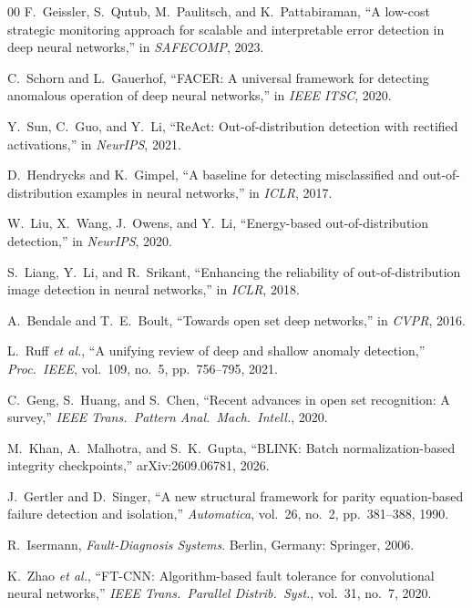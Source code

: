 \documentclass[journal]{IEEEtran}
\begin{document}
\begin{thebibliography}{00}
F.~Geissler, S.~Qutub, M.~Paulitsch, and K.~Pattabiraman, ``A low-cost strategic monitoring approach for scalable and interpretable error detection in deep neural networks,'' in \textit{SAFECOMP}, 2023.

C.~Schorn and L.~Gauerhof, ``FACER: A universal framework for detecting anomalous operation of deep neural networks,'' in \textit{IEEE ITSC}, 2020.

Y.~Sun, C.~Guo, and Y.~Li, ``ReAct: Out-of-distribution detection with rectified activations,'' in \textit{NeurIPS}, 2021.

D.~Hendrycks and K.~Gimpel, ``A baseline for detecting misclassified and out-of-distribution examples in neural networks,'' in \textit{ICLR}, 2017.

W.~Liu, X.~Wang, J.~Owens, and Y.~Li, ``Energy-based out-of-distribution detection,'' in \textit{NeurIPS}, 2020.

S.~Liang, Y.~Li, and R.~Srikant, ``Enhancing the reliability of out-of-distribution image detection in neural networks,'' in \textit{ICLR}, 2018.

A.~Bendale and T.~E.~Boult, ``Towards open set deep networks,'' in \textit{CVPR}, 2016.

L.~Ruff \textit{et al.}, ``A unifying review of deep and shallow anomaly detection,'' \textit{Proc.\ IEEE}, vol.~109, no.~5, pp.~756--795, 2021.

C.~Geng, S.~Huang, and S.~Chen, ``Recent advances in open set recognition: A survey,'' \textit{IEEE Trans.\ Pattern Anal.\ Mach.\ Intell.}, 2020.

M.~Khan, A.~Malhotra, and S.~K.\ Gupta, ``BLINK: Batch normalization-based integrity checkpoints,'' arXiv:2609.06781, 2026.

J.~Gertler and D.~Singer, ``A new structural framework for parity equation-based failure detection and isolation,'' \textit{Automatica}, vol.~26, no.~2, pp.~381--388, 1990.

R.~Isermann, \textit{Fault-Diagnosis Systems}. Berlin, Germany: Springer, 2006.

K.~Zhao \textit{et al.}, ``FT-CNN: Algorithm-based fault tolerance for convolutional neural networks,'' \textit{IEEE Trans.\ Parallel Distrib.\ Syst.}, vol.~31, no.~7, 2020.


\end{thebibliography}
\end{document}

